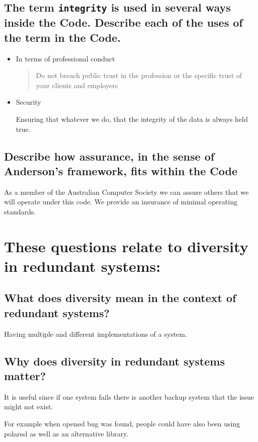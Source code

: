 \documentclass{article}
\begin{document}
\subsection{The term \texttt{integrity} is used in several ways inside the Code. Describe each of the uses of the term in the Code.}

\begin{itemize}
\item In terms of professional conduct
\begin{quote}
Do not breach public trust in the profession or the specific trust of your clients and 
employers 
\end{quote}
\item Security

Ensuring that whatever we do, that the integrity of the data is always held true. 

\end{itemize}

\subsection{Describe how assurance, in the sense of Anderson’s framework, fits within the Code}

As a member of the Australian Computer Society we can assure others that we will operate under this code. We provide an insurance of minimal operating standards. 

\section[Redundant Systems]{These questions relate to diversity in redundant systems:}

\subsection{What does diversity mean in the context of redundant systems?}

Having multiple and different implementations of a system. 

\subsection{Why does diversity in redundant systems matter?}

It is useful since if one system fails there is another backup system that the issue might not exist. 

For example when openssl bug was found, people could have also been using polarssl as well as an alternative library. 
\end{document}
